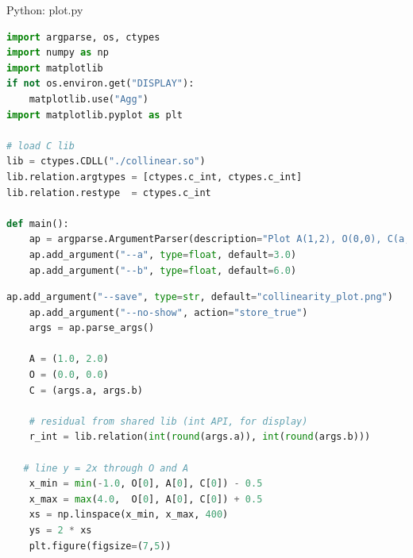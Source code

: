 \documentclass{beamer}
\begin{document}
\begin{frame}[fragile]{Python: plot.py }
\begin{lstlisting}[language=Python]
import argparse, os, ctypes
import numpy as np
import matplotlib
if not os.environ.get("DISPLAY"):
    matplotlib.use("Agg")
import matplotlib.pyplot as plt

# load C lib
lib = ctypes.CDLL("./collinear.so")
lib.relation.argtypes = [ctypes.c_int, ctypes.c_int]
lib.relation.restype  = ctypes.c_int

def main():
    ap = argparse.ArgumentParser(description="Plot A(1,2), O(0,0), C(a,b) and line y=2x")
    ap.add_argument("--a", type=float, default=3.0)
    ap.add_argument("--b", type=float, default=6.0)
    \end{lstlisting}
\end{frame}
\begin{frame}[fragile]
\begin{lstlisting}[language=Python]
    ap.add_argument("--save", type=str, default="collinearity_plot.png")
    ap.add_argument("--no-show", action="store_true")
    args = ap.parse_args()

    A = (1.0, 2.0)
    O = (0.0, 0.0)
    C = (args.a, args.b)

    # residual from shared lib (int API, for display)
    r_int = lib.relation(int(round(args.a)), int(round(args.b)))

   # line y = 2x through O and A
    x_min = min(-1.0, O[0], A[0], C[0]) - 0.5
    x_max = max(4.0,  O[0], A[0], C[0]) + 0.5
    xs = np.linspace(x_min, x_max, 400)
    ys = 2 * xs
    plt.figure(figsize=(7,5))
    \end{lstlisting}
\end{frame}
\end{document}
